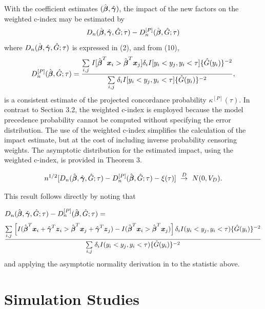 \documentclass[12pt]{article}
\newcommand{\bmx}{\mbox{\boldmath $x$}}
\newcommand{\bg}{\mbox{\boldmath $\gamma$}}
\newcommand{\bb}{\mbox{\boldmath $\beta$}}
\newcommand{\bmz}{\mbox{\boldmath $z$}}
\def\stackunder#1#2{\mathrel{\mathop{#2}\limits_{#1}}}
\begin{document}
With the coefficient estimates $(\hat{\bb}, \hat{\bg})$, the impact of the new factors on the weighted c-index may be estimated by
\[  D_n(\hat{\bb}, \hat{\bg}, \hat{G} ; \tau) - D_n^{[P]}(\hat{\bb}, \hat{G} ; \tau) \]
 where $D_n(\hat{\bb}, \hat{\bg}, \hat{G} ; \tau)$ is expressed in (2), and from (10), 
 \[ D_n^{[P]}(\hat{\bb}, \hat{G} ; \tau) = \frac{\stackunder{i, j }{\sum } I[\hat{\bb}^T\bmx_i > \hat{\bb}^T\bmx_j] \delta_i I[y_i <y _j, y_i < \tau] \{\hat{G}(y_i)\}^{-2}} 
{\stackunder{i, j }{\sum } \delta_i I[y_i <y _j, y_i < \tau] \{\hat{G}(y_i)\}^{-2}},  \]
is a consistent estimate of the projected concordance probability $\kappa^{[P]}(\tau)$.  In contrast to Section 3.2, the weighted c-index is employed because the model precedence probability cannot be computed without specifying the error distribution. The use of the weighted c-index simplifies the calculation of the impact estimate, but at the cost of including inverse probability censoring weights. The asymptotic distribution for the estimated impact, using the weighted c-index, is provided in Theorem 3.   

\vskip 0.35in

\begin{equation} n^{1/2} [ D_n(\hat{\bb},\hat{\bg}, \hat{G}; \tau) - D_n^{[P]}(\hat{\bb}, \hat{G}; \tau)  - \xi(\tau)]  \ \stackrel{D}{\rightarrow} \ N(0, V_D) . \end{equation}

\vskip 0.35in

\noindent This result follows directly by noting that 

\bigskip

\noindent $D_n(\hat{\bb}, \hat{\bg}, \hat{G} ; \tau) - D_n^{[P]}(\hat{\bb}, \hat{G} ; \tau) = $
\[ \frac{\stackunder{i, j }{\sum } \left[ I(\hat{\bb}^T\bmx_{i} + \hat{\bg}^T\bmz_{i} > \hat{\bb}^T\bmx_j + \hat{\bg}^T\bmz_j) - I(\hat{\bb}^T\bmx_{i} > \hat{\bb}^T\bmx_j) \right]  \delta_i I(y_i <y _j, y_i < \tau)   \{\hat{G}(y_i)\}^{-2}}
{\stackunder{i, j }{\sum } \delta_i I(y_i <y _j, y_i < \tau) \{\hat{G}(y_i)\}^{-2}} \]
and applying the asymptotic normality derivation in \cite{Uno2011} to the statistic above.


\vskip 0.50in


\section{Simulation Studies} 
\end{document}
